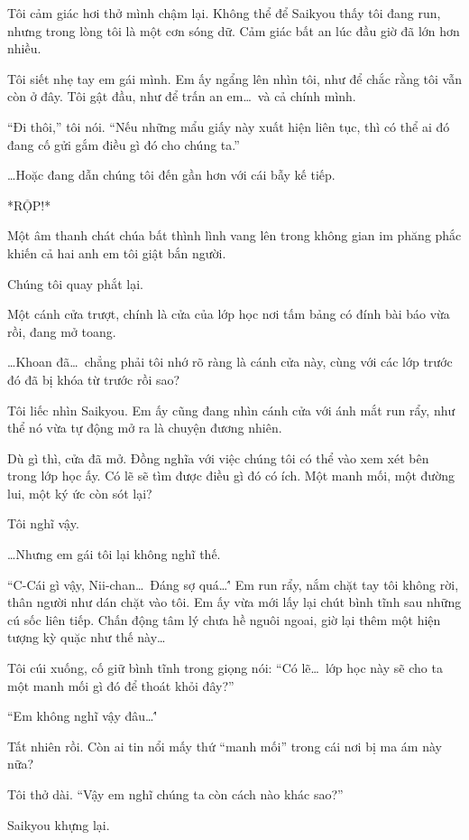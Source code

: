 \documentclass[../main.tex]{subfiles}
\begin{document}
Tôi cảm giác hơi thở mình chậm lại. Không thể để Saikyou thấy tôi đang run, nhưng trong lòng tôi là một cơn sóng dữ. Cảm giác bất an lúc đầu giờ đã lớn hơn nhiều.

Tôi siết nhẹ tay em gái mình. Em ấy ngẩng lên nhìn tôi, như để chắc rằng tôi vẫn còn ở đây. Tôi gật đầu, như để trấn an em\dots\ và cả chính mình.

``Đi thôi,'' tôi nói. ``Nếu những mẩu giấy này xuất hiện liên tục, thì có thể ai đó đang cố gửi gắm điều gì đó cho chúng ta.''

\dots Hoặc đang dẫn chúng tôi đến gần hơn với cái bẫy kế tiếp.

*RỘP!*

Một âm thanh chát chúa bất thình lình vang lên trong không gian im phăng phắc khiến cả hai anh em tôi giật bắn người.

Chúng tôi quay phắt lại.

Một cánh cửa trượt, chính là cửa của lớp học nơi tấm bảng có đính bài báo vừa rồi, đang mở toang.

\dots Khoan đã\dots\ chẳng phải tôi nhớ rõ ràng là cánh cửa này, cùng với các lớp trước đó đã bị khóa từ trước rồi sao?

Tôi liếc nhìn Saikyou. Em ấy cũng đang nhìn cánh cửa với ánh mắt run rẩy, như thể nó vừa tự động mở ra là chuyện đương nhiên.

Dù gì thì, cửa đã mở. Đồng nghĩa với việc chúng tôi có thể vào xem xét bên trong lớp học ấy. Có lẽ sẽ tìm được điều gì đó có ích. Một manh mối, một đường lui, một ký ức còn sót lại?

Tôi nghĩ vậy.

\dots Nhưng em gái tôi lại không nghĩ thế.

``C-Cái gì vậy, Nii-chan\dots\ Đáng sợ quá\dots\'' Em run rẩy, nắm chặt tay tôi không rời, thân người như dán chặt vào tôi. Em ấy vừa mới lấy lại chút bình tĩnh sau những cú sốc liên tiếp. Chấn động tâm lý chưa hề nguôi ngoai, giờ lại thêm một hiện tượng kỳ quặc như thế này\dots\

Tôi cúi xuống, cố giữ bình tĩnh trong giọng nói:
``Có lẽ\dots\ lớp học này sẽ cho ta một manh mối gì đó để thoát khỏi đây?''

``Em không nghĩ vậy đâu\dots\''

Tất nhiên rồi. Còn ai tin nổi mấy thứ ``manh mối'' trong cái nơi bị ma ám này nữa?

Tôi thở dài. ``Vậy em nghĩ chúng ta còn cách nào khác sao?''

Saikyou khựng lại.
\end{document}
